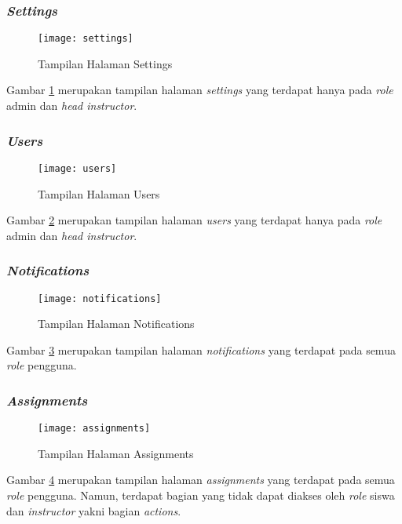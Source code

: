\subsubsection{\textit{Settings}}
\begin{figure}[H]
	\centering  
	\texttt{[image: settings]}  
	\caption[Tampilan Halaman \textit{Settings}]{Tampilan Halaman Settings} 
	\label{fig:settings} 
\end{figure}

Gambar \ref{fig:settings} merupakan tampilan halaman \textit{settings} yang terdapat hanya pada \textit{role} admin dan \textit{head instructor}. 

\subsubsection{\textit{Users}}
\begin{figure}[H]
	\centering  
	\texttt{[image: users]}  
	\caption[Tampilan Halaman \textit{Users}]{Tampilan Halaman Users} 
	\label{fig:users} 
\end{figure}

Gambar \ref{fig:users} merupakan tampilan halaman \textit{users} yang terdapat hanya pada \textit{role} admin dan \textit{head instructor}.

\subsubsection{\textit{Notifications}}
\begin{figure}[H]
	\centering  
	\texttt{[image: notifications]}  
	\caption[Tampilan Halaman \textit{Notifications}]{Tampilan Halaman Notifications} 
	\label{fig:notifications} 
\end{figure}

Gambar \ref{fig:notifications} merupakan tampilan halaman \textit{notifications} yang terdapat pada semua \textit{role} pengguna.

\subsubsection{\textit{Assignments}}
\begin{figure}[H]
	\centering  
	\texttt{[image: assignments]}  
	\caption[Tampilan Halaman \textit{Assignments}]{Tampilan Halaman Assignments} 
	\label{fig:assignments} 
\end{figure}

Gambar \ref{fig:assignments} merupakan tampilan halaman \textit{assignments} yang terdapat pada semua \textit{role} pengguna. Namun, terdapat bagian yang tidak dapat diakses oleh \textit{role} siswa dan \textit{instructor} yakni bagian \textit{actions}.
